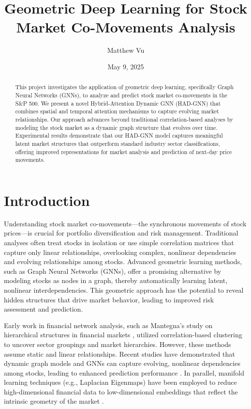 \documentclass[12pt]{article}
\title{Geometric Deep Learning for Stock Market Co-Movements Analysis}
\author{Matthew Vu}
\date{May 9, 2025}
\begin{document}
\maketitle

\begin{abstract}
This project investigates the application of geometric deep learning, specifically Graph Neural Networks (GNNs), to analyze and predict stock market co-movements in the S\&P 500. We present a novel Hybrid-Attention Dynamic GNN (HAD-GNN) that combines spatial and temporal attention mechanisms to capture evolving market relationships. Our approach advances beyond traditional correlation-based analyses by modeling the stock market as a dynamic graph structure that evolves over time. Experimental results demonstrate that our HAD-GNN model captures meaningful latent market structures that outperform standard industry sector classifications, offering improved representations for market analysis and prediction of next-day price movements.
\end{abstract}

\section{Introduction}

Understanding stock market co-movements—the synchronous movements of stock prices—is crucial for portfolio diversification and risk management. Traditional analyses often treat stocks in isolation or use simple correlation matrices that capture only linear relationships, overlooking complex, nonlinear dependencies and evolving relationships among stocks. Advanced geometric learning methods, such as Graph Neural Networks (GNNs), offer a promising alternative by modeling stocks as nodes in a graph, thereby automatically learning latent, nonlinear interdependencies. This geometric approach has the potential to reveal hidden structures that drive market behavior, leading to improved risk assessment and prediction.

Early work in financial network analysis, such as Mantegna's study on hierarchical structures in financial markets \cite{mantegna1999}, utilized correlation-based clustering to uncover sector groupings and market hierarchies. However, these methods assume static and linear relationships. Recent studies have demonstrated that dynamic graph models and GNNs can capture evolving, nonlinear dependencies among stocks, leading to enhanced prediction performance \cite{kipf2017}. In parallel, manifold learning techniques (e.g., Laplacian Eigenmaps) have been employed to reduce high-dimensional financial data to low-dimensional embeddings that reflect the intrinsic geometry of the market \cite{belkin2003}.
\end{document}
